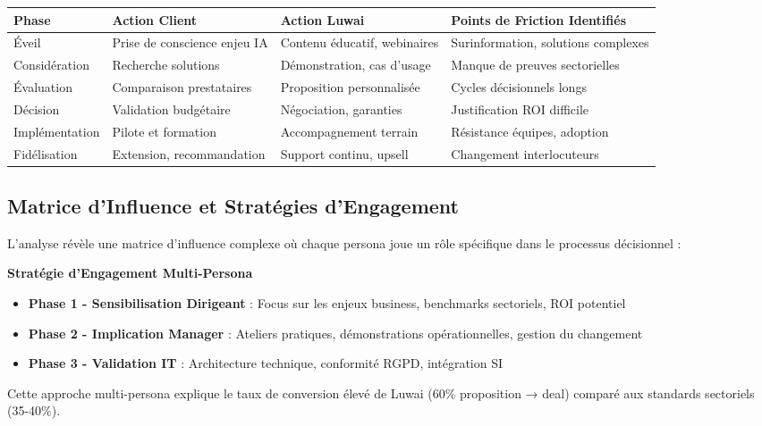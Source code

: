 \begin{longtable}{@{}p{2.5cm}p{4cm}p{4cm}p{4.5cm}@{}}
\toprule
\textbf{Phase} & \textbf{Action Client} & \textbf{Action Luwai} & \textbf{Points de Friction Identifiés} \\
\midrule
Éveil & Prise de conscience enjeu IA & Contenu éducatif, webinaires & Surinformation, solutions complexes \\
Considération & Recherche solutions & Démonstration, cas d'usage & Manque de preuves sectorielles \\
Évaluation & Comparaison prestataires & Proposition personnalisée & Cycles décisionnels longs \\
Décision & Validation budgétaire & Négociation, garanties & Justification ROI difficile \\
Implémentation & Pilote et formation & Accompagnement terrain & Résistance équipes, adoption \\
Fidélisation & Extension, recommandation & Support continu, upsell & Changement interlocuteurs \\
\bottomrule
\end{longtable}

\subsection{Matrice d'Influence et Stratégies d'Engagement}

L'analyse révèle une matrice d'influence complexe où chaque persona joue un rôle spécifique dans le processus décisionnel :

\textbf{Stratégie d'Engagement Multi-Persona}
\begin{itemize}
    \item \textbf{Phase 1 - Sensibilisation Dirigeant} : Focus sur les enjeux business, benchmarks sectoriels, ROI potentiel
    \item \textbf{Phase 2 - Implication Manager} : Ateliers pratiques, démonstrations opérationnelles, gestion du changement
    \item \textbf{Phase 3 - Validation IT} : Architecture technique, conformité RGPD, intégration SI
\end{itemize}

Cette approche multi-persona explique le taux de conversion élevé de Luwai (60\% proposition → deal) comparé aux standards sectoriels (35-40\%).

